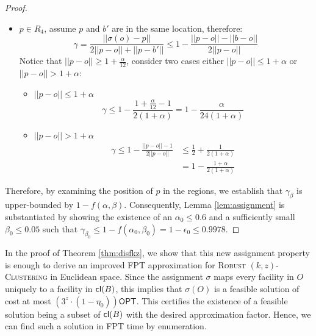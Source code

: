 \documentclass[11pt]{article}
\newcommand{\opt}{\ensuremath{\textsf{OPT}}}
\newcommand{\fpt}{\textsf{FPT}\xspace}
\newcommand{\rkc}{\textsc{Robust $(k,z)$-Clustering}\xspace}
\begin{document}
\begin{proof}
\begin{itemize}
    \item $p\in R_4$, assume $p$ and $b'$ are in the same location, therefore:
    \begin{equation*}
    \gamma= \frac{||\sigma(o)-p||}{2||p-o|| + ||p-b'||} \leq 1-\frac{||p-o||-||b-o||}{2||p-o|| }
    \end{equation*}
    Notice that $||p-o||\geq 1+ \frac{\alpha}{12}$, consider two cases either  $||p-o|| \leq 1+\alpha$ or  $||p-o|| > 1+\alpha$:
    \begin{itemize}
        \item  $||p-o|| \leq 1+\alpha$ 
        \begin{equation*}
            \gamma\leq 1 - \frac{{1+\frac{\alpha}{12}}-1}{2(1+\alpha)}  = 1 - \frac{\alpha}{24(1+\alpha)}
         \end{equation*}
        \item  $||p-o|| > 1+\alpha$ 
        \begin{equation*}
           \begin{split}
            \gamma\leq 1 - \frac{||p-o||-1} {2||p-o||}& \leq \frac{1}{2} +\frac{1}{2(1+\alpha)}\\
            &= 1- \frac{1+\alpha}{2(1+\alpha)}
            \end{split}
        \end{equation*}    
  
\end{itemize}
\end{itemize}
Therefore, by examining the position of $p$ in the regions, we establish that $\gamma_{\beta}$ is upper-bounded by $1 - f(\alpha, \beta)$. Consequently, Lemma \ref{lem:assignment} is substantiated by showing the existence of an $\alpha_0 \leq 0.6$ and a sufficiently small $\beta_0 \leq 0.05$ such that $\gamma_{\beta_0} \leq 1 - f(\alpha_0, \beta_0) = 1 - \epsilon_0 \leq 0.9978$. 
\end{proof}


In the proof of Theorem \ref{thm:disfkz}, we show that this new assignment property is enough to derive an improved \fpt approximation for \rkc in Euclidean space.
Since the assignment $\sigma$ maps every facility in $O$ uniquely to a facility in ${\sf cl}(B)$, this implies that $\sigma(O)$ is a feasible solution of cost at most $(3^z \cdot (1-\eta_0))\opt$. This certifies the existence of a feasible solution being a subset of ${\sf cl}(B)$ with the desired approximation factor. Hence, we can find such a solution in \fpt time by enumeration.
\end{document}
